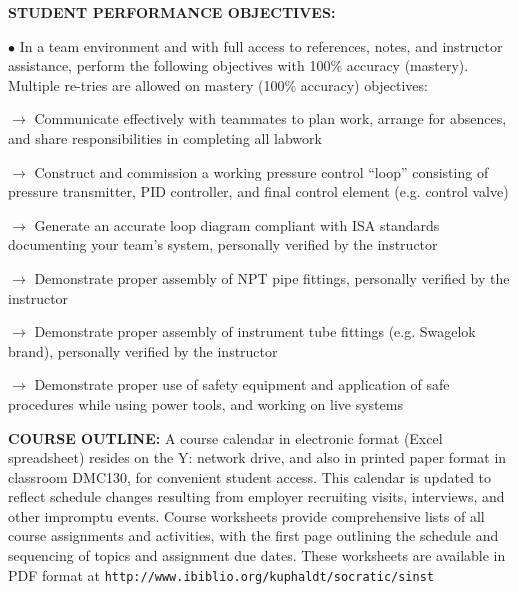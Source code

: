 \noindent
{\bf STUDENT PERFORMANCE OBJECTIVES:}

\item{$\bullet$} In a team environment and with full access to references, notes, and instructor assistance, perform the following objectives with 100\% accuracy (mastery).  Multiple re-tries are allowed on mastery (100\% accuracy) objectives:
\item\item{$\rightarrow$} Communicate effectively with teammates to plan work, arrange for absences, and share responsibilities in completing all labwork
\item\item{$\rightarrow$} Construct and commission a working pressure control ``loop'' consisting of pressure transmitter, PID controller, and final control element (e.g. control valve)
\item\item{$\rightarrow$} Generate an accurate loop diagram compliant with ISA standards documenting your team's system, personally verified by the instructor
\item\item{$\rightarrow$} Demonstrate proper assembly of NPT pipe fittings, personally verified by the instructor
\item\item{$\rightarrow$} Demonstrate proper assembly of instrument tube fittings (e.g. Swagelok brand), personally verified by the instructor
\item\item{$\rightarrow$} Demonstrate proper use of safety equipment and application of safe procedures while using power tools, and working on live systems


\vfil \eject

\noindent
{\bf COURSE OUTLINE:} A course calendar in electronic format (Excel spreadsheet) resides on the Y: network drive, and also in printed paper format in classroom DMC130, for convenient student access.  This calendar is updated to reflect schedule changes resulting from employer recruiting visits, interviews, and other impromptu events.  Course worksheets provide comprehensive lists of all course assignments and activities, with the first page outlining the schedule and sequencing of topics and assignment due dates.  These worksheets are available in PDF format at {\tt http://www.ibiblio.org/kuphaldt/socratic/sinst}

